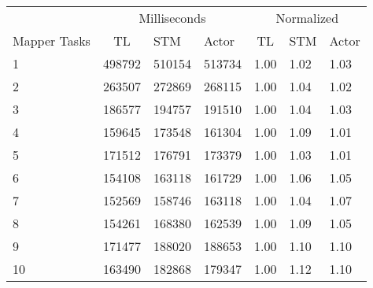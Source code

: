 \begin{center}
\begin{table}[h]
\centering
\begin{tabular}{l|cll|cll}
             & \multicolumn{3}{c|}{Milliseconds} & \multicolumn{3}{c}{Normalized} \\
Mapper Tasks & TL     & STM     & Actor     & TL      & STM      & Actor     \\ \hline
1                   &     498792      &      510154      &    513734  &	 1.00   & 1.02 &    1.03    \\
2                   &     263507      &      272869      &    268115  &  1.00   & 1.04 &    1.02    \\
3                   &     186577      &      194757      &    191510  &  1.00   & 1.04 &    1.03    \\
4                   &     159645      &      173548      &    161304  &  1.00   & 1.09 &    1.01    \\
5                   &     171512      &      176791      &    173379  &  1.00   & 1.03 &    1.01    \\
6                   &     154108      &      163118      &    161729  &  1.00   & 1.06 &    1.05    \\
7                   &     152569      &      158746      &    163118  &  1.00   & 1.04 &    1.07    \\
8                   &     154261      &      168380      &    162539  &  1.00   & 1.09 &    1.05    \\
9                   &     171477      &      188020      &    188653  &  1.00   & 1.10 &    1.10    \\
10                 &     163490      &      182868      &    179347  &	 1.00   & 1.12 &    1.10    \\
\end{tabular}
\label{table:test_results_concurrent_tasks}
\end{table}
\end{center}

